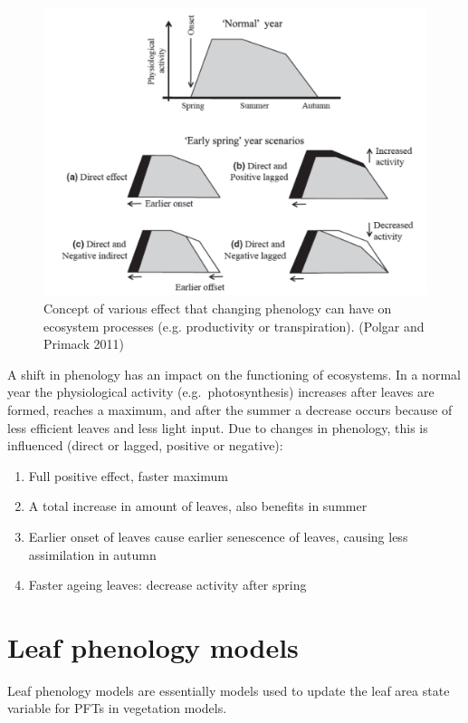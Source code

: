 \documentclass[12pt,oneside]{book}
\begin{document}
\begin{figure}

{\centering \includegraphics[width=0.8\linewidth]{figures/chap4/f43_Polgar} 

}

\caption{Concept of various effect that changing phenology can have on ecosystem processes (e.g. productivity or transpiration). (Polgar and Primack 2011)}\label{fig:f43}
\end{figure}

A shift in phenology has an impact on the functioning of ecosystems. In
a normal year the physiological activity (e.g.~photosynthesis) increases
after leaves are formed, reaches a maximum, and after the summer a
decrease occurs because of less efficient leaves and less light input.
Due to changes in phenology, this is influenced (direct or lagged,
positive or negative):

\begin{enumerate}
\def\labelenumi{\Alph{enumi})}
\item
  Full positive effect, faster maximum
\item
  A total increase in amount of leaves, also benefits in summer
\item
  Earlier onset of leaves cause earlier senescence of leaves, causing
  less assimilation in autumn
\item
  Faster ageing leaves: decrease activity after spring
\end{enumerate}

\section{Leaf phenology models}\label{leaf-phenology-models}

Leaf phenology models are essentially models used to update the leaf
area state variable for PFTs in vegetation models.
\end{document}
